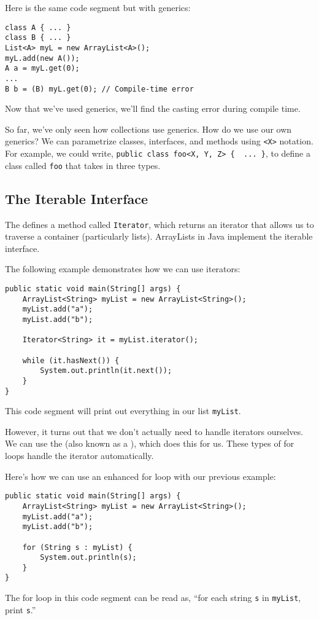 Here is the same code segment but with generics:

\begin{lstlisting}
class A { ... }
class B { ... }
List<A> myL = new ArrayList<A>();
myL.add(new A());
A a = myL.get(0);
...
B b = (B) myL.get(0); // Compile-time error
\end{lstlisting}

Now that we've used generics, we'll find the casting error during compile time.

So far, we've only seen how collections use generics. How do we use our own generics? We can parametrize classes, interfaces, and methods using \verb!<X>! notation. For example, we could write, \verb!public class foo<X, Y, Z> {  ... }!, to define a class called \verb!foo! that takes in three types. 


\subsection{The Iterable Interface}
The  defines a method called \verb!Iterator!, which returns an iterator that allows us to traverse a container (particularly lists). ArrayLists in Java implement the iterable interface. 

The following example demonstrates how we can use iterators:

\begin{lstlisting}
public static void main(String[] args) {
    ArrayList<String> myList = new ArrayList<String>();
    myList.add("a");
    myList.add("b");
    
    Iterator<String> it = myList.iterator();

    while (it.hasNext()) {
        System.out.println(it.next());
    }
}
\end{lstlisting}

This code segment will print out everything in our list \verb!myList!. 

However, it turns out that we don't actually need to handle iterators ourselves. We can use the  (also known as a ), which does this for us. These types of for loops handle the iterator automatically. 

Here's how we can use an enhanced for loop with our previous example:


\begin{lstlisting}
public static void main(String[] args) {
    ArrayList<String> myList = new ArrayList<String>();
    myList.add("a");
    myList.add("b");
    
    for (String s : myList) {
        System.out.println(s);
    }
}
\end{lstlisting}

The for loop in this code segment can be read as, ``for each string \verb!s! in \verb!myList!, print \verb!s!.''